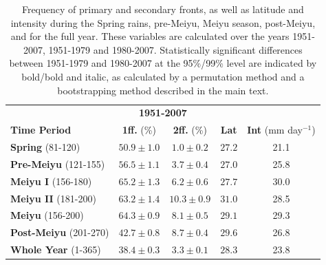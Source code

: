 \documentclass[draft,grl]{AGUTeX}
\begin{document}
\begin{table}
\caption{Frequency of primary and secondary fronts, as well as latitude and intensity during the Spring rains, pre-Meiyu, Meiyu season, post-Meiyu, and for the full year. These variables are calculated over the years 1951-2007, 1951-1979 and 1980-2007. Statistically significant differences between 1951-1979 and 1980-2007 at the 95\%/99\% level are indicated by bold/bold and italic, as calculated by a permutation method and a bootstrapping method described in the main text.}
\centering

\begin{tabular}{ l c c c c}
	 \multicolumn{5}{c}{\textbf{1951-2007}} \\
	 \textbf{Time Period} & \textbf{1ff.} (\%) &\textbf{2ff.} (\%) & \textbf{Lat} & \textbf{Int} (mm day$^{-1}$) \\
	 \hline
	\textbf{Spring} (81-120) & $50.9 \pm 1.0$ & $1.0 \pm 0.2$ & $27.2$ & 21.1 \\
	\textbf{Pre-Meiyu} (121-155) & $56.5 \pm 1.1$ & $3.7 \pm 0.4$ & $27.0$ & 25.8 \\
	\textbf{Meiyu I} (156-180) &	$65.2 \pm 1.3$ & $6.2 \pm 0.6$ & $27.7$ & 30.0 \\
	\textbf{Meiyu II} (181-200) & $63.2 \pm 1.4$ & $10.3 \pm 0.9$ & $31.0$ & 28.5 \\
	\textbf{Meiyu} (156-200) & $64.3 \pm 0.9$ & $8.1 \pm 0.5$ & $29.1$ & 29.3 \\
	\textbf{Post-Meiyu} (201-270) & $42.7 \pm 0.8 $ & $8.7 \pm 0.4$ & $29.6$ & 26.8 \\
	\textbf{Whole Year} (1-365) & $38.4 \pm 0.3$ & $3.3 \pm 0.1$ & $28.3$ & 23.8 \\
\end{tabular}


\end{table}
\end{document}
